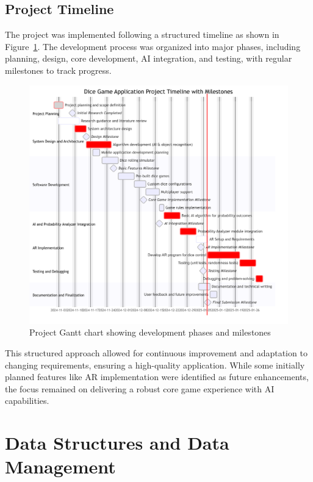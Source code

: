 \subsection{Project Timeline}

The project was implemented following a structured timeline as shown in Figure~\ref{fig:gantt}. The development process was organized into major phases, including planning, design, core development, AI integration, and testing, with regular milestones to track progress.

\begin{figure}[ht!]
    \centering
    \includegraphics[width=\textwidth]{img/gantt_chart.png}
    \caption{Project Gantt chart showing development phases and milestones}
    \label{fig:gantt}
\end{figure}

This structured approach allowed for continuous improvement and adaptation to changing requirements, ensuring a high-quality application. While some initially planned features like AR implementation were identified as future enhancements, the focus remained on delivering a robust core game experience with AI capabilities.

\section{Data Structures and Data Management}

